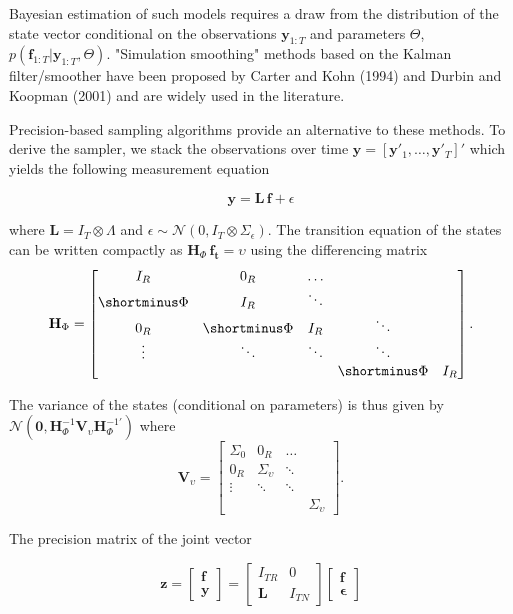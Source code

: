 \documentclass[notitlepage,a4paper,12pt]{article}
\begin{document}
Bayesian estimation of such models requires a draw from the distribution of the state vector conditional on the observations $\mathbf{y}_{1:T}$ and parameters $\Theta$, $p(\mathbf{f}_{1:T}|\mathbf{y}_{1:T}, \Theta)$. "Simulation smoothing" methods based on the Kalman filter/smoother have been proposed by Carter and Kohn (1994) and Durbin and Koopman (2001) and are widely used in the literature.

Precision-based sampling algorithms \citep{chanjeliazkov_2009} provide an alternative to these methods. To derive the sampler, we stack the observations over time $\mathbf{y} = [\mathbf{y}'_1, \dots, \mathbf{y}'_T]'$ which yields the following measurement equation

\begin{equation}
\mathbf{y} = \mathbf{L} \, \mathbf{f} + \epsilon
\end{equation} 

where $ \mathbf{L} = I_T \otimes \Lambda$ and $\epsilon \sim \mathcal{N}(0, I_T \otimes \Sigma_{\epsilon})$. The transition equation of the states can be written compactly as $\mathbf{H}_{\Phi} \, \mathbf{f_t} = \upsilon$ using the differencing matrix 
$$
\mathbf{H}_{\Phi}
=
\begin{bmatrix}
    I_R & 0_R & \dots \\
    \shortminus\Phi & I_R & \ddots \\
    0_R & \shortminus\Phi & I_R & \ddots \\
    \vdots & \ddots & \ddots & \ddots \\
    & & & \shortminus\Phi & I_R
\end{bmatrix}.
$$

The variance of the states (conditional on parameters) is thus given by $\mathcal{N}(\mathbf{0},\mathbf{H}^{-1}_{\Phi} \mathbf{V}_{\upsilon} \mathbf{H}^{-1'}_{\Phi})$ where 
$$
\mathbf{V}_{\upsilon} = 
\begin{bmatrix}
    \Sigma_{0} & 0_R & \dots \\
    0_R & \Sigma_{\upsilon} & \ddots \\
    \vdots & \ddots & \ddots \\
    & & & \Sigma_{\upsilon} 
\end{bmatrix}
.
$$

The precision matrix of the joint vector 

\begin{equation}
    \mathbf{z} = 
    \begin{bmatrix}
        \mathbf{f} \\
        \mathbf{y}
    \end{bmatrix}
    = 
    \begin{bmatrix}
        I_{TR} & 0 \\
        \mathbf{L} & I_{TN} 
    \end{bmatrix}
    \begin{bmatrix}
        \mathbf{f} \\
        \mathbf{\epsilon}
    \end{bmatrix} 
\end{equation}
\end{document}
